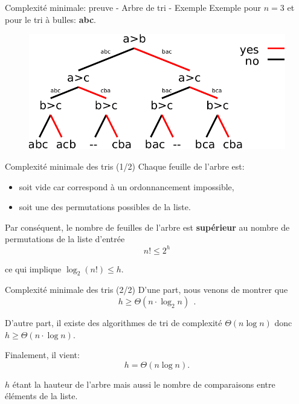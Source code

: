 \begin{frame}{Complexité minimale: preuve - Arbre de tri - Exemple}
  Exemple pour $n=3$ et pour le tri à bulles: \textbf{abc}.
  \begin{figure}
    \centering
    \includegraphics[width = 0.95 \linewidth]{./images/arbreTri.pdf}
  \end{figure}
\end{frame}

\begin{frame}{Complexité minimale des tris (1/2)}
  Chaque feuille de l'arbre est:
  \begin{itemize}
      \item soit vide car correspond à un ordonnancement impossible,
      \item soit une des permutations possibles de la liste.
  \end{itemize}

  Par conséquent, le nombre de feuilles de l'arbre est \textbf{supérieur} au nombre de permutations de la liste d'entrée
  $$n! \leq 2^h$$

  ce qui implique $\log_2 (n!) \leq h.$

\end{frame}

\begin{frame}{Complexité minimale des tris (2/2)}
	D'une part, nous venons de montrer que
	$$h \geq \Theta(n \cdot \log_2 n)~~.$$

	D'autre part, il existe des algorithmes de tri de complexité $\Theta(n\log n)$ donc $h \geq \Theta(n \cdot \log n)$.

	Finalement, il vient:
	$$\boxed{h = \Theta(n \log n).}$$

	$h$ étant la hauteur de l'arbre mais aussi le nombre de comparaisons entre éléments de la liste.
\end{frame}


